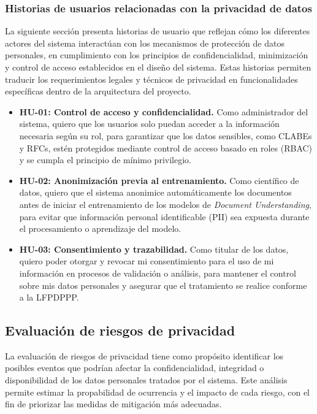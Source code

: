 \subsubsection{Historias de usuarios relacionadas con la privacidad de datos}

La siguiente sección presenta historias de usuario que reflejan cómo los diferentes actores del sistema interactúan con los mecanismos de protección de datos personales, en cumplimiento con los principios de confidencialidad, minimización y control de acceso establecidos en el diseño del sistema.  
Estas historias permiten traducir los requerimientos legales y técnicos de privacidad en funcionalidades específicas dentro de la arquitectura del proyecto.

\begin{itemize}
    \item \textbf{HU-01: Control de acceso y confidencialidad.}  
    Como administrador del sistema, quiero que los usuarios solo puedan acceder a la información necesaria según su rol, para garantizar que los datos sensibles, como CLABEs y RFCs, estén protegidos mediante control de acceso basado en roles (RBAC) y se cumpla el principio de mínimo privilegio.

    \item \textbf{HU-02: Anonimización previa al entrenamiento.}  
    Como científico de datos, quiero que el sistema anonimice automáticamente los documentos antes de iniciar el entrenamiento de los modelos de \textit{Document Understanding}, para evitar que información personal identificable (PII) sea expuesta durante el procesamiento o aprendizaje del modelo.

    \item \textbf{HU-03: Consentimiento y trazabilidad.}  
    Como titular de los datos, quiero poder otorgar y revocar mi consentimiento para el uso de mi información en procesos de validación o análisis, para mantener el control sobre mis datos personales y asegurar que el tratamiento se realice conforme a la LFPDPPP.
\end{itemize}

\subsection{Evaluación de riesgos de privacidad}

La evaluación de riesgos de privacidad tiene como propósito identificar los posibles eventos que podrían afectar la confidencialidad, integridad o disponibilidad de los datos personales tratados por el sistema. Este análisis permite estimar la propabilidad de ocurrencia y el impacto de cada riesgo, con el fin de priorizar las medidas de mitigación más adecuadas.

